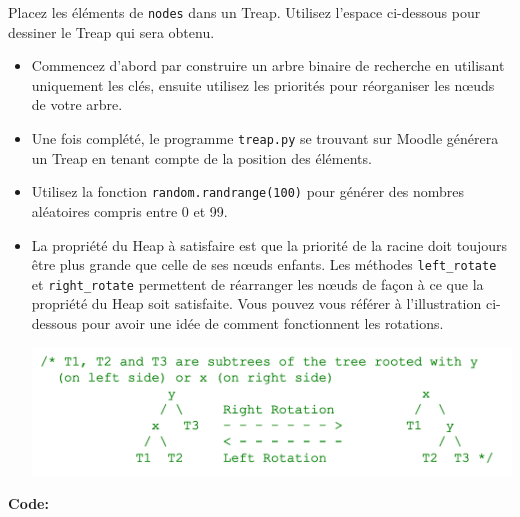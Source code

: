 \begin{Exercice}[30 minutes]
    Placez les éléments de \lstinline{nodes} dans un Treap. Utilisez l'espace ci-dessous pour dessiner le Treap qui sera obtenu.


    \begin{conseil}
        \begin{itemize}
            \item Commencez d'abord par construire un arbre binaire de recherche en utilisant uniquement les clés, ensuite utilisez les priorités pour réorganiser les nœuds de votre arbre.
            \item Une fois complété, le programme \lstinline{treap.py} se trouvant sur Moodle générera un Treap en tenant compte de la position des éléments. 
            \item Utilisez la fonction \lstinline{random.randrange(100)} pour générer des nombres aléatoires compris entre 0 et 99.
            \item La propriété du Heap à satisfaire est que la priorité de la racine doit toujours être plus grande que celle de ses nœuds enfants.
            Les méthodes \lstinline{left_rotate} et \lstinline{right_rotate} permettent de réarranger les nœuds de façon à ce que la propriété du Heap soit satisfaite. Vous pouvez vous référer à l'illustration ci-dessous pour avoir une idée de comment fonctionnent les rotations.
            \begin{center}
                \includegraphics[width=\linewidth]{resources/treap_heap_property.png}
            \end{center}
        
        \end{itemize}
        
        
    \end{conseil}

    \begin{dessin}{}
        \vspace{14cm}
    \end{dessin}

    \begin{solution}
        \textbf{Code:}
        


\end{solution}
\end{Exercice}
